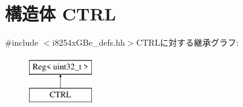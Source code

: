\hypertarget{structiGbReg_1_1Regs_1_1CTRL}{
\section{構造体 CTRL}
\label{structiGbReg_1_1Regs_1_1CTRL}
}


{\ttfamily \#include $<$i8254xGBe\_\-defs.hh$>$}CTRLに対する継承グラフ:\begin{figure}[H]
\begin{center}
\leavevmode
\includegraphics[height=2cm]{structiGbReg_1_1Regs_1_1CTRL}
\end{center}
\end{figure}
